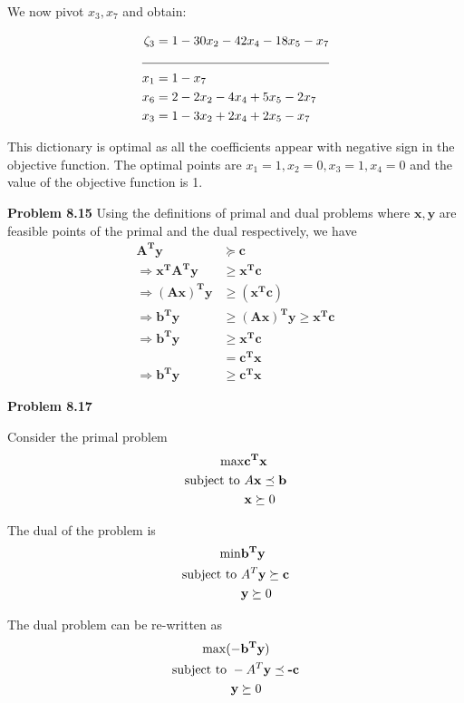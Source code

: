 \documentclass[letterpaper,12pt]{article}
\theoremstyle{definition}
\begin{document}
We now pivot $x_3, x_7$ and obtain:

\begin{align*}
  \zeta_3 &= 1-30x_2-42x_4-18x_5-x_7\\
  \cline{1-2}
  x_1 &= 1-x_7 \\
  x_6 &= 2-2x_2-4x_4+5x_5-2x_7 \\
  x_3 &= 1-3x_2+2x_4+2x_5-x_7 \\
\end{align*}

This dictionary is optimal as all the coefficients appear with negative sign in the objective function. The
optimal points are $x_1=1, x_2=0, x_3=1, x_4=0$ and the value of the objective function is 1.

\vspace{3mm}
\noindent\textbf{Problem 8.15}
  Using the definitions of primal and dual problems where $\bm{x, y}$ are feasible points of the primal
  and the dual respectively, we have
\begin{align*}
   \bm{A^Ty} &\succeq \bm{c} \\
   \Rightarrow \bm{x^TA^Ty} &\ge \bm {x^Tc}\\
   \Rightarrow \bm{(Ax)^Ty} &\ge \bm{(x^Tc)}\\
   \Rightarrow \bm{b^Ty} &\ge \bm{(Ax)^Ty} \ge \bm{x^Tc}\\
   \Rightarrow \bm{b^Ty} &\ge \bm{x^Tc}\\
   &=\bm{c^Tx}\\
   \Rightarrow \bm{b^Ty} &\ge \bm{c^Tx}
\end{align*}


\vspace{3mm}
\noindent\textbf{Problem 8.17}

Consider the primal problem
\begin{align*}
\max &\mathbf{c^Tx} \\
\textnormal{subject to } &A\textbf{x}\preceq \textbf{b}\\
&\textbf{x} \succeq 0\\
\end{align*}

The dual of the problem is
\begin{align*}
\min &\mathbf{b^Ty} \\
\textnormal{subject to } &A^T\textbf{y}\succeq \textbf{c}\\
&\textbf{y} \succeq 0\\
\end{align*}

The dual problem can be re-written as
\begin{align*}
\max (&\mathbf{-b^Ty}) \\
\textnormal{subject to } &-A^T\textbf{y}\preceq \textbf{-c}\\
&\textbf{y} \succeq 0\\
\end{align*}
\end{document}
